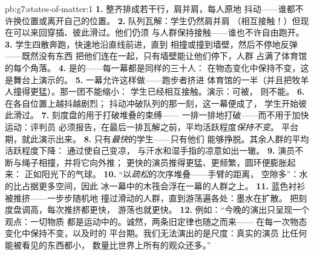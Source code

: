 \begin{solution}{pb:g7:states-of-matter:1}
\textbf{1.} 整齐排成若干行，肩并肩，每人原地
抖动——谁都不许换位置或离开自己的位置。
\textbf{2.} 队列瓦解：学生仍然肩并肩
（相互接触！）但现在可以来回穿插、彼此滑过。他们仍须
与人群保持接触——谁也不许自由跑开。
\textbf{3.} 学生四散奔跑，快速地沿直线前进，直到
相撞或撞到墙壁，然后不停地反弹——既然没有东西
把他们连在一起，只有墙壁能让他们停下，人群
占满了体育馆的每个角落。
\textbf{4.} 是的——每一幕都是同样的三十人：
在物态变化中保持不变，这是舞台上演示的。
\textbf{5.} 一幕允许这样做——跑步者挤进
体育馆的一半（并且把牧羊人撞得更猛）。那一团不能缩小：
学生已经相互接触。演示：可被，
则不能。
\textbf{6.} 在各自位置上越抖越剧烈；
抖动冲破队列的那一刻，这一幕便成了，
学生开始彼此滑过。
\textbf{7.} 刻度盘的用于打破堆叠的束缚——
一排一排地打破——而不用于加快运动：评判员
必须报告，在最后一排瓦解之前，平均活跃程度\emph{保持不变}。
平台期，就此演示出来。
\textbf{8.} 只有\emph{最快}的学生——只有他们
能够挣脱。其余人群的平均活跃程度下降：
通过使自己变凉，
与汗水和湿手指的凉意如出一辙。
\textbf{9.} 演员不断与绳子相撞，并将它向外推；
更快的演员推得更猛、更频繁，圆环便膨胀起来：
正如阳光下的气球。
\textbf{10.} “以\emph{疏松}的次序堆叠——手臂的距离，
空隙多”：水的比占据更多空间，因此
冰一幕中的木筏会浮在一幕的人群之上。
\textbf{11.} 蓝色衬衫被推挤——一步步随机地
撞过滑动的人群，直到游荡遍各处：墨水在扩散。
把刻度盘调高，每次推挤都更快，
游荡也就更快。
\textbf{12.} 例如：“今晚的演出只呈现一个观点：一切物质
都是运动中的。诚然，两条旧定律也随之而来——
在每一次物态变化中保持不变，以及时的
平台期。我们无法演出的是尺度：真实的演员
比任何能被看见的东西都小，
数量比世界上所有的观众还多。”
\end{solution}

